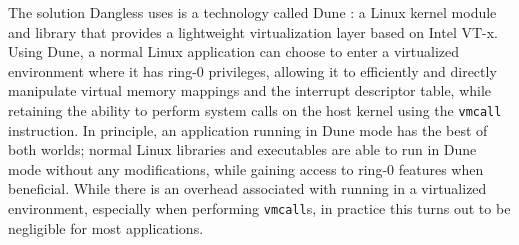 The solution Dangless uses is a technology called Dune : a Linux kernel module and library that provides a lightweight virtualization layer based on Intel VT-x. Using Dune, a normal Linux application can choose to enter a virtualized environment where it has ring-0 privileges, allowing it to efficiently and directly manipulate virtual memory mappings and the interrupt descriptor table, while retaining the ability to perform system calls on the host kernel using the \lstinline!vmcall! instruction. In principle, an application running in Dune mode has the best of both worlds; normal Linux libraries and executables are able to run in Dune mode without any modifications, while gaining access to ring-0 features when beneficial. While there is an overhead associated with running in a virtualized environment, especially when performing \lstinline!vmcall!s, in practice this turns out to be negligible for most applications.
